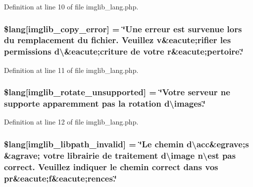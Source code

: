 Definition at line 10 of file imglib\+\_\+lang.\+php.

\subsubsection[{\texorpdfstring{\$lang}{$lang}}]{\setlength{\rightskip}{0pt plus 5cm}\$lang\mbox{[}\textquotesingle{}imglib\+\_\+copy\+\_\+error\textquotesingle{}\mbox{]} = \char`\"{}Une erreur est survenue lors du remplacement du fichier. Veuillez {\bf v}\&eacute;rifier les permissions d\textbackslash{}\textquotesingle{}\&eacute;criture de votre {\bf r}\&eacute;pertoire.\char`\"{}}\hypertarget{application_2language_2french_2imglib__lang_8php_a012b6a0d2b3a8ef934e8783d2fbd6535}{}\label{application_2language_2french_2imglib__lang_8php_a012b6a0d2b3a8ef934e8783d2fbd6535}


Definition at line 11 of file imglib\+\_\+lang.\+php.

\subsubsection[{\texorpdfstring{\$lang}{$lang}}]{\setlength{\rightskip}{0pt plus 5cm}\$lang\mbox{[}\textquotesingle{}imglib\+\_\+rotate\+\_\+unsupported\textquotesingle{}\mbox{]} = \char`\"{}Votre serveur ne supporte apparemment pas la rotation d\textbackslash{}\textquotesingle{}images.\char`\"{}}\hypertarget{application_2language_2french_2imglib__lang_8php_ab1c77c6b58fc5bf8e979ab4237ec87e7}{}\label{application_2language_2french_2imglib__lang_8php_ab1c77c6b58fc5bf8e979ab4237ec87e7}


Definition at line 12 of file imglib\+\_\+lang.\+php.

\subsubsection[{\texorpdfstring{\$lang}{$lang}}]{\setlength{\rightskip}{0pt plus 5cm}\$lang\mbox{[}\textquotesingle{}imglib\+\_\+libpath\+\_\+invalid\textquotesingle{}\mbox{]} = \char`\"{}Le chemin d\textbackslash{}\textquotesingle{}acc\&egrave;{\bf s} \&agrave; votre librairie de traitement d\textbackslash{}\textquotesingle{}image n\textbackslash{}\textquotesingle{}est pas correct. Veuillez indiquer le chemin correct dans vos pr\&eacute;{\bf f}\&eacute;rences.\char`\"{}}\hypertarget{application_2language_2french_2imglib__lang_8php_a8f190c17a02ca89334c8bf0a04333f65}{}\label{application_2language_2french_2imglib__lang_8php_a8f190c17a02ca89334c8bf0a04333f65}


